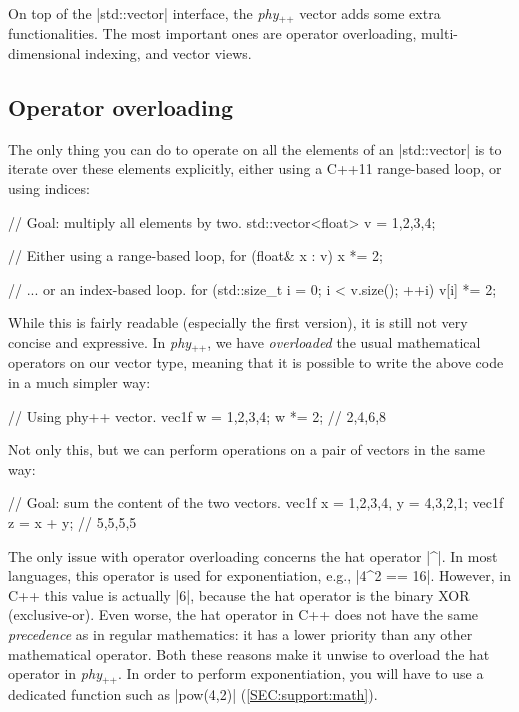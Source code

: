 \documentclass[12pt]{report}
\newcommand{\phypp}{\textit{phy}$_{\text{++}}$\xspace}
\newcommand{\stdvec}{\cppinline|std::vector|\xspace}
\newenvironment{warning}
{
    \begin{mdframed}[style=warning,frametitle={Warning}]
}
{
    \end{mdframed}
}
\begin{document}
On top of the \stdvec interface, the \phypp vector adds some extra functionalities. The most important ones are operator overloading, multi-dimensional indexing, and vector views.

\subsection{Operator overloading \label{SEC:core:overview:overloading}}

The only thing you can do to operate on all the elements of an \stdvec is to iterate over these elements explicitly, either using a C++11 range-based loop, or using indices:
\begin{cppcode}
// Goal: multiply all elements by two.
std::vector<float> v = {1,2,3,4};

// Either using a range-based loop,
for (float& x : v) {
    x *= 2;
}

// ... or an index-based loop.
for (std::size_t i = 0; i < v.size(); ++i) {
    v[i] *= 2;
}
\end{cppcode}

While this is fairly readable (especially the first version), it is still not very concise and expressive. In \phypp, we have \emph{overloaded} the usual mathematical operators on our vector type, meaning that it is possible to write the above code in a much simpler way:

\begin{cppcode}
// Using phy++ vector.
vec1f w = {1,2,3,4};
w *= 2; // {2,4,6,8}
\end{cppcode}

Not only this, but we can perform operations on a pair of vectors in the same way:
\begin{cppcode}
// Goal: sum the content of the two vectors.
vec1f x = {1,2,3,4}, y = {4,3,2,1};
vec1f z = x + y; // {5,5,5,5}
\end{cppcode}

\begin{warning}
The only issue with operator overloading concerns the hat operator \cppinline|^|. In most languages, this operator is used for exponentiation, e.g., \cppinline|4^2 == 16|. However, in C++ this value is actually \cppinline|6|, because the hat operator is the binary XOR (exclusive-or). Even worse, the hat operator in C++ does not have the same \emph{precedence} as in regular mathematics: it has a lower priority than any other mathematical operator. Both these reasons make it unwise to overload the hat operator in \phypp. In order to perform exponentiation, you will have to use a dedicated function such as \cppinline|pow(4,2)| (\ref{SEC:support:math}).
\end{warning}
\end{document}
